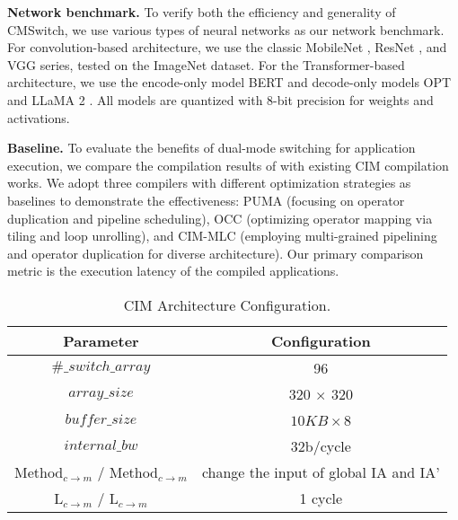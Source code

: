 \noindent\textbf{Network benchmark.}
To verify both the efficiency and generality of CMSwitch, we use various types of neural networks as our network benchmark. For convolution-based architecture, we use the classic MobileNet \cite{sandler2018mobilenetv2}, ResNet \cite{he2016deep}, and VGG \cite{simonyan2014very} series, tested on the ImageNet dataset\cite{deng2009imagenet}. For the Transformer-based architecture, we use the encode-only model BERT \cite{devlin2018bert} and decode-only models OPT \cite{zhang2022opt} and LLaMA 2 \cite{touvron2023llama}. All models are quantized with 8-bit precision for weights and activations.

\noindent\textbf{Baseline.}
To evaluate the benefits of dual-mode switching for application execution, we compare the compilation results of 
\name with existing CIM compilation works. We adopt three compilers with different optimization strategies as baselines to demonstrate the effectiveness: PUMA \cite{ankit2019puma} (focusing on operator duplication and pipeline scheduling), OCC \cite{siemieniuk2021occ} (optimizing operator mapping via tiling and loop unrolling), and CIM-MLC \cite{qu2024cim} (employing multi-grained pipelining and operator duplication for diverse architecture). Our primary comparison metric is the execution latency of the compiled applications.

\begin{table}[]
    \centering
    \caption{CIM Architecture Configuration.}
    \label{tab:config}
    \resizebox{0.85\linewidth}{!}
{
    \begin{tabular}{c|c}
    \hline
    Parameter & Configuration\\\hline
   $ \#\_switch\_array$     &  96\\
   $ array\_size$     & 320 $\times$ 320\\
   $ buffer\_size$ & $ 10KB\times$8\\
    $internal\_bw$ & 32b/cycle\\
    Method$_{c \to m}$ / Method$_{c \to m}$ & change the input of global IA and IA'\\
    L$_{c \to m}$ / L$_{c \to m}$ & 1 cycle \\\hline
     \end{tabular}}    
\end{table}


